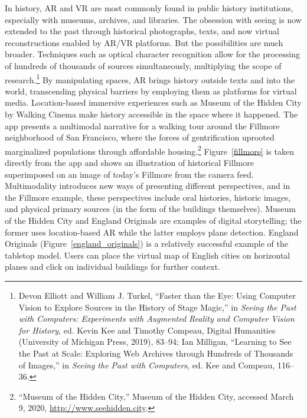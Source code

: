 In history, AR and VR are most commonly found in public history institutions, especially with museums, archives, and libraries. The obsession with seeing is now extended to the past through historical photographs, texts, and now virtual reconstructions enabled by AR/VR platforms. But the possibilities are much broader. Techniques such as optical character recognition allow for the processing of hundreds of thousands of sources simultaneously, multiplying the scope of research.\footnote{Devon Elliott and William J. Turkel, “Faster than the Eye: Using Computer Vision to Explore Sources in the History of Stage Magic,” in \textit{Seeing the Past with Computers: Experiments with Augmented Reality and Computer Vision for History}, ed. Kevin Kee and Timothy Compeau, Digital Humanities (University of Michigan Press, 2019), 83–94; Ian Milligan, “Learning to See the Past at Scale: Exploring Web Archives through Hundreds of Thousands of Images,” in \textit{Seeing the Past with Computers}, ed. Kee and Compeau, 116–36.} By manipulating spaces, AR brings history outside texts and into the world, transcending physical barriers by employing them as platforms for virtual media. Location-based immersive experiences such as Museum of the Hidden City by Walking Cinema make history accessible in the space where it happened. The app presents a multimodal narrative for a walking tour around the Fillmore neighborhood of San Francisco, where the forces of gentrification uprooted marginalized populations through affordable housing.\footnote{“Museum of the Hidden City,” Museum of the Hidden City, accessed March 9, 2020, \url{http://www.seehidden.city}.} Figure~\ref{fillmore} is taken directly from the app and shows an illustration of historical Fillmore superimposed on an image of today's Fillmore from the camera feed. Multimodality introduces new ways of presenting different perspectives, and in the Fillmore example, these perspectives include oral histories, historic images, and physical primary sources (in the form of the buildings themselves). Museum of the Hidden City and England Originals are  examples of digital storytelling; the former uses location-based AR while the latter employs plane detection. England Originals (Figure~\ref{england_originals}) is a relatively successful example of the tabletop model. Users can place the virtual map of English cities on horizontal planes and click on individual buildings for further context.

\begin{figure}[!ht]
\end{figure}

